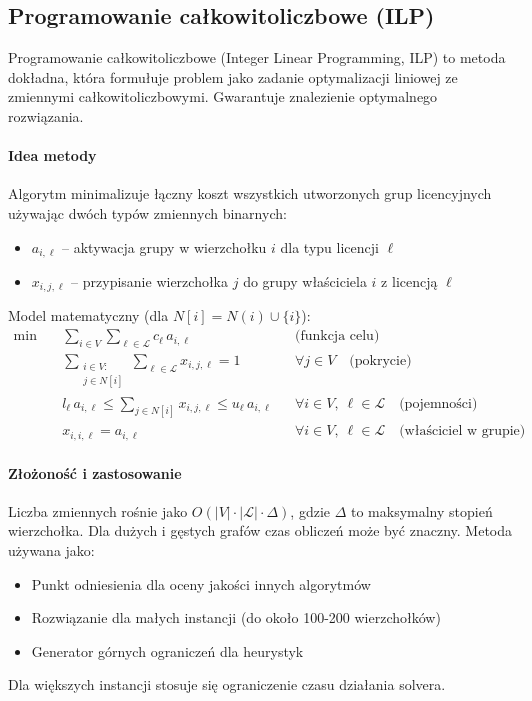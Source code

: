 \subsection{Programowanie całkowitoliczbowe (ILP)}\label{subsec:ilp}

Programowanie całkowitoliczbowe (Integer Linear Programming, ILP) to metoda dokładna, która formułuje problem jako zadanie optymalizacji liniowej ze zmiennymi całkowitoliczbowymi. Gwarantuje znalezienie optymalnego rozwiązania.

\paragraph{Idea metody}
Algorytm minimalizuje łączny koszt wszystkich utworzonych grup licencyjnych używając dwóch typów zmiennych binarnych:
\begin{itemize}
  \item $a_{i,\ell}$ -- aktywacja grupy w wierzchołku $i$ dla typu licencji $\ell$
  \item $x_{i,j,\ell}$ -- przypisanie wierzchołka $j$ do grupy właściciela $i$ z licencją $\ell$
\end{itemize}

Model matematyczny (dla $N[i] = N(i) \cup \{i\}$):
\begin{align}
\min\quad & \sum_{i\in V}\sum_{\ell\in\mathcal{L}} c_\ell\, a_{i,\ell} && \text{(funkcja celu)}\\[4pt]
& \sum_{\substack{i\in V:\\ j\in N[i]}}\sum_{\ell\in\mathcal{L}} x_{i,j,\ell} = 1 && \forall j\in V \quad \text{(pokrycie)} \\[2pt]
& l_\ell\, a_{i,\ell} \le \sum_{j\in N[i]} x_{i,j,\ell} \le u_\ell\, a_{i,\ell} && \forall i\in V,\ \ell\in\mathcal{L} \quad \text{(pojemności)} \\[2pt]
& x_{i,i,\ell} = a_{i,\ell} && \forall i\in V,\ \ell\in\mathcal{L} \quad \text{(właściciel w grupie)}
\end{align}

\paragraph{Złożoność i zastosowanie}
Liczba zmiennych rośnie jako $O(|V| \cdot |\mathcal{L}| \cdot \Delta)$, gdzie $\Delta$ to maksymalny stopień wierzchołka. Dla dużych i gęstych grafów czas obliczeń może być znaczny. Metoda używana jako:
\begin{itemize}
  \item Punkt odniesienia dla oceny jakości innych algorytmów
  \item Rozwiązanie dla małych instancji (do około 100-200 wierzchołków)
  \item Generator górnych ograniczeń dla heurystyk
\end{itemize}
Dla większych instancji stosuje się ograniczenie czasu działania solvera.

